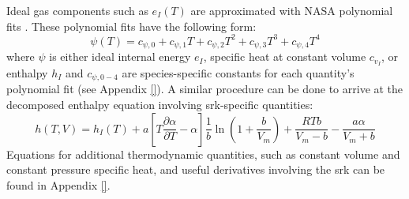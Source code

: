 Ideal gas components such as $e_I(T)$ are approximated with NASA polynomial fits \cite{NASAPoly}. These polynomial fits have the following form:
\begin{equation} \label{NASA_poly}
\psi(T) = c_{\psi, 0} + c_{\psi, 1}T + c_{\psi, 2}T^2 + c_{\psi, 3}T^3 + c_{\psi, 4}T^4  
\end{equation}
where $\psi$ is either ideal internal energy $e_I$, specific heat at constant volume $c_{v_I}$, or enthalpy $h_I$ and $c_{\psi,0-4}$ are species-specific constants for each quantity's polynomial fit (see Appendix \ref{}). A similar procedure can be done to arrive at the decomposed enthalpy equation involving \gls{srk}-specific quantities:
\begin{equation} \label{thermo_enthalpy}
h(T,V) = h_I(T) +  a \left[ T \dfrac{\partial \alpha}{\partial T} - \alpha \right] \dfrac{1}{b}\ln\left( 1 + \dfrac{b}{V_m} \right) + \dfrac{RTb}{V_m - b} - \dfrac{a \alpha}{V_m + b}
\end{equation}
Equations for additional thermodynamic quantities, such as constant volume and constant pressure specific heat, and useful derivatives involving the \gls{srk} can be found in Appendix \ref{}. 

